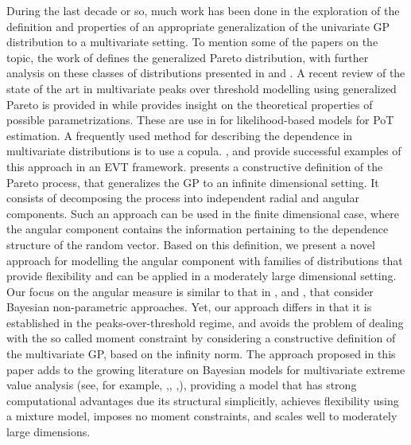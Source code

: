 During the last decade or so, much work has been done in the exploration of the 
    definition and properties of an appropriate generalization of the univariate 
    GP distribution to a multivariate setting.  To mention some of the papers on 
    the topic, the work of \citep{rootzen2006} defines the generalized Pareto 
    distribution, with further analysis on these classes of distributions 
    presented in \cite{falk2008} and \cite{michel2008}.  A recent review of the 
    state of the art in multivariate peaks over threshold modelling using 
    generalized Pareto is provided in \cite{rootzen2018} while \cite{RoSeWa2018a} 
    provides insight on the theoretical properties of possible parametrizations. 
    These are use in \cite{KiRoSeWa2019} for likelihood-based models for PoT 
    estimation. A frequently used method for describing the dependence in 
    multivariate distributions is to use a copula. \cite{renard2007}, and 
    \cite{falk2019} provide successful  examples of this approach in an EVT 
    framework. \cite{ferreira2014} presents a constructive definition of the 
    Pareto process, that generalizes the GP to an infinite dimensional setting. It 
    consists of decomposing the process into independent radial and angular 
    components. Such an approach can be used in the finite dimensional case, where 
    the angular component contains the information pertaining to the dependence 
    structure of the random vector. Based on this definition, we present a novel 
    approach for modelling  the angular component with families of distributions 
    that provide flexibility and can be applied in a moderately large dimensional 
    setting.  Our focus on the angular measure is similar to that in \cite{boldi2007},
    \cite{SaNa2014} and \cite{HaCaCh2017}, that consider Bayesian non-parametric 
    approaches. Yet, our approach differs in that it is established in the 
    peaks-over-threshold regime, and avoids the problem of dealing with the so 
    called moment constraint by considering a constructive definition of the 
    multivariate GP, based on the infinity norm. The approach proposed in this paper
    adds to the growing literature on Bayesian models for multivariate extreme
    value analysis (see, for example, \cite{boldi2007},\cite{guillotte2011},
    \cite{SaNa2014},\cite{hanson2017}), providing a model that has strong computational
    advantages due its structural simplicitly, achieves flexibility using 
    a mixture model, imposes no moment constraints, and scales well to moderately 
    large dimensions.
  
